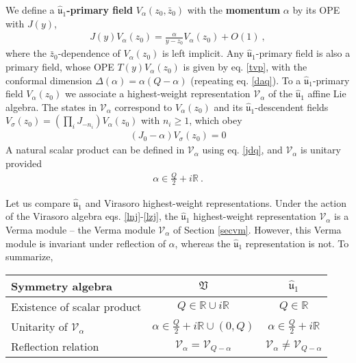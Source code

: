 \documentclass[12pt,a4paper,notitlepage]{report}
\numberwithin{equation}{section}
\theoremstyle{break}
\begin{document}
We define a \textbf{\boldmath $\hat{\mathfrak{u}}_1$-primary field} $V_{\alpha}(z_0,\bar{z}_0)$ with the \textbf{\boldmath momentum} $\alpha$ by its OPE with $J(y)$,
\begin{align}
 \boxed{J(y) V_\alpha(z_0) = \frac{\alpha}{y-z_0} V_\alpha(z_0) + O(1)}\ ,
\label{jva}
\end{align}
where the $\bar{z}_0$-dependence of $V_\alpha(z_0)$ is left implicit. 
Any $\hat{\mathfrak{u}}_1$-primary field is also a primary field, whose OPE $T(y)V_\alpha(z_0)$ is given by eq. \eqref{tvp}, with the conformal dimension $\Delta(\alpha) = \alpha(Q-\alpha)$ (repeating eq. \eqref{daq}).
To a $\hat{\mathfrak{u}}_1$-primary field $V_\alpha(z_0)$ we associate a highest-weight representation $\mathcal{V}_\alpha$ of the $\hat{\mathfrak{u}}_1$ affine Lie algebra.
The states in $\mathcal{V}_\alpha$ correspond to $V_\alpha(z_0)$ and its $\hat{\mathfrak{u}}_1$-descendent fields $V_\sigma(z_0)=\left(\prod_i J_{-n_i}\right) V_\alpha(z_0)$ with $n_i\geq 1$, which obey 
\begin{align}
 \left(J_0 - \alpha\right) V_\sigma(z_0) = 0
\label{jma}
\end{align}
A natural scalar product can be defined in $\mathcal{V}_\alpha$ using eq. \eqref{jdq}, and $\mathcal{V}_\alpha$ is unitary provided
\begin{align}
 \alpha \in \frac{Q}{2} + i{\mathbb{R}}\ .
\label{aif}
\end{align}

Let us compare $\hat{\mathfrak{u}}_1$ and Virasoro highest-weight representations. 
Under the action of the Virasoro algebra eqs. \eqref{lnj}-\eqref{lzj}, the $\hat{\mathfrak{u}}_1$ highest-weight representation $\mathcal{V}_\alpha$ is a Verma module -- the Verma module $\mathcal{V}_\alpha$ of Section \ref{secvm}.
However, this Verma module is invariant under reflection of $\alpha$, whereas the $\hat{\mathfrak{u}}_1$ representation is not.
To summarize,
\begin{center}
\renewcommand{\arraystretch}{1.3}
 \begin{tabular}{|l|c|c|}
  \hline
 Symmetry algebra  & $\mathfrak{V}$ & $\hat{\mathfrak{u}}_1 $
\\
\hline\hline
 Existence of scalar product & $Q\in {\mathbb{R}} \cup i{\mathbb{R}} $ & $Q\in {\mathbb{R}}$ 
\\
\hline
 Unitarity of $\mathcal{V}_\alpha$ & $\alpha\in \frac{Q}{2}+i{\mathbb{R}} \cup (0,Q) $ & $\alpha \in \frac{Q}{2}+i{\mathbb{R}}$
\\
\hline 
 Reflection relation  & $\mathcal{V}_\alpha = \mathcal{V}_{Q-\alpha} $ & $\mathcal{V}_\alpha \neq \mathcal{V}_{Q-\alpha} $ 
\\
\hline
 \end{tabular}
\end{center}
\end{document}
